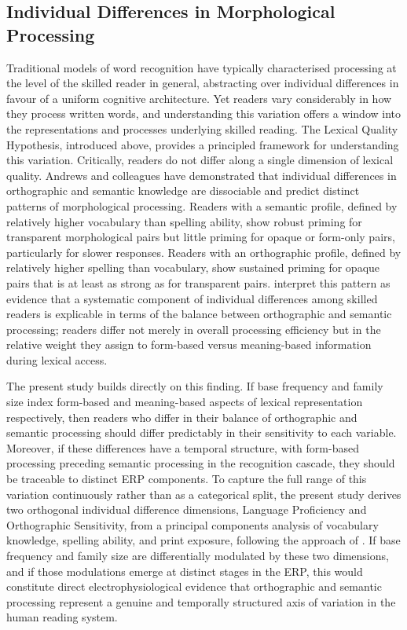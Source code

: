 \documentclass[utf8]{FrontiersinHarvard} %
\begin{document}
	
	\subsection{Individual Differences in Morphological Processing}
	
	Traditional models of word recognition have typically characterised processing at the level of the skilled reader in general, abstracting over individual differences in favour of a uniform cognitive architecture. Yet readers vary considerably in how they process written words, and understanding this variation offers a window into the representations and processes underlying skilled reading. The Lexical Quality Hypothesis, introduced above, provides a principled framework for understanding this variation. Critically, readers do not differ along a single dimension of lexical quality. Andrews and colleagues  \citep{andrewsIndividualDifferencesSkilled2012, andrewsMorphologicalPrimingStronger2013} have demonstrated that individual differences in orthographic and semantic knowledge are dissociable and predict distinct patterns of morphological processing. Readers with a semantic profile, defined by relatively higher vocabulary than spelling ability, show robust priming for transparent morphological pairs but little priming for opaque or form-only pairs, particularly for slower responses. Readers with an orthographic profile, defined by relatively higher spelling than vocabulary, show sustained priming for opaque pairs that is at least as strong as for transparent pairs. \citet{andrewsMorphologicalPrimingStronger2013} interpret this pattern as evidence that a systematic component of individual differences among skilled readers is explicable in terms of the balance between orthographic and semantic processing; readers differ not merely in overall processing efficiency but in the relative weight they assign to form-based versus meaning-based information during lexical access.
	
	The present study builds directly on this finding. If base frequency and family size index form-based and meaning-based aspects of lexical representation respectively, then readers who differ in their balance of orthographic and semantic processing should differ predictably in their sensitivity to each variable. Moreover, if these differences have a temporal structure, with form-based processing preceding semantic processing in the recognition cascade, they should be traceable to distinct ERP components. To capture the full range of this variation continuously rather than as a categorical split, the present study derives two orthogonal individual difference dimensions, Language Proficiency and Orthographic Sensitivity, from a principal components analysis of vocabulary knowledge, spelling ability, and print exposure, following the approach of \citet{andrewsMorphologicalPrimingStronger2013}. If base frequency and family size are differentially modulated by these two dimensions, and if those modulations emerge at distinct stages in the ERP, this would constitute direct electrophysiological evidence that orthographic and semantic processing represent a genuine and temporally structured axis of variation in the human reading system.
	
\end{document}
